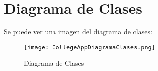 %
%
%
%

\cleardoublepage
\chapter{Diagrama de Clases}
\label{chap:ClassDiagram}

Se puede ver una imagen del diagrama de clases:

\begin{figure}[h]
	\centering
	\texttt{[image: CollegeAppDiagramaClases.png]}
	\caption{Diagrama de Clases}
	\label{fig:ClassDiagram}
\end{figure}